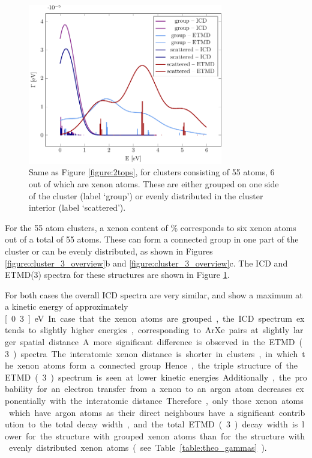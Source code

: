 \begin{figure}[ht]
 \centering
 \includegraphics[width=8.5cm]{pics/ar_3_6in.pdf}
 \caption{Same as Figure \protect\ref{figure:2tops}, for clusters consisting of
          55 atoms, 6 out of which are xenon atoms. These are either grouped
          on one side of the cluster (label `group') or evenly distributed
          in the cluster interior (label `scattered').}
 \label{figure:ar_3_6in}
\end{figure}
%
For the 55 atom clusters, a xenon content of \unit[10--12]{\%}
corresponds to six xenon atoms out of a total of 55 atoms. These can form a connected 
group in one part of the cluster or can be evenly distributed,
as shown in Figures \ref{figure:cluster_3_overview}b and \ref{figure:cluster_3_overview}c. The
ICD and ETMD(3) spectra for these structures are shown in Figure \ref{figure:ar_3_6in}.

For both cases the overall ICD spectra are very similar, and show a maximum at a kinetic energy of approximately \unit[0.3]{eV}. 
In case that the xenon atoms are grouped, the ICD spectrum extends to slightly higher energies, corresponding to ArXe pairs at slightly larger spatial distance.
A more significant difference is observed in the ETMD(3) spectra. 
The interatomic xenon distance is shorter in clusters, in which the xenon atoms form a connected group.
Hence, the triple structure of the ETMD(3) spectrum is seen at lower kinetic energies. 
Additionally, the probability for an electron
transfer from a xenon to an argon atom decreases exponentially with the
interatomic distance. Therefore, only those xenon atoms which have argon
atoms as their direct neighbours have a significant contribution to the
total decay width, and the total ETMD(3) decay width is lower for the structure with
grouped xenon atoms than for
the structure with evenly distributed xenon atoms (see Table \ref{table:theo_gammas}).

